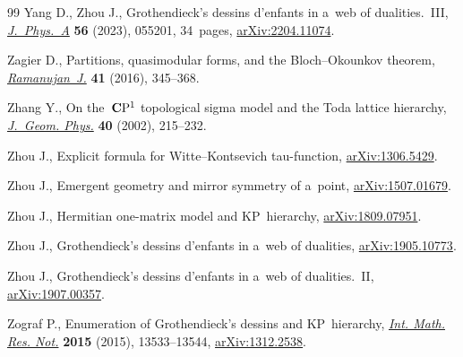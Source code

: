 \documentclass[pdftex]{sigma}
\numberwithin{equation}{section}
\begin{document}
\begin{thebibliography}{99}
Yang D., Zhou J., Grothendieck's dessins d'enfants in a~web of
 dualities.~{III},
 \href{https://doi.org/10.1088/1751-8121/acb744}{\textit{J.~Phys.~A}}
 \textbf{56} (2023), 055201, 34~pages,
 \href{http://arxiv.org/abs/2204.11074}{arXiv:2204.11074}.

Zagier D., Partitions, quasimodular forms, and the {B}loch--{O}kounkov theorem,
 \href{https://doi.org/10.1007/s11139-015-9730-8}{\textit{Ramanujan~J.}}
 \textbf{41} (2016), 345--368.

Zhang Y., On the~{${\bf C}{\rm P}^1$} topological sigma model and the {T}oda
 lattice hierarchy,
 \href{https://doi.org/10.1016/S0393-0440(01)00036-5}{\textit{J.~Geom. Phys.}}
 \textbf{40} (2002), 215--232.

Zhou J., Explicit formula for {W}itte--{K}ontsevich tau-function,
 \href{http://arxiv.org/abs/1306.5429}{arXiv:1306.5429}.

Zhou J., Emergent geometry and mirror symmetry of a~point,
 \href{http://arxiv.org/abs/1507.01679}{arXiv:1507.01679}.

Zhou J., Hermitian one-matrix model and {KP}~hierarchy,
 \href{http://arxiv.org/abs/1809.07951}{arXiv:1809.07951}.

Zhou J., Grothendieck's dessins d'enfants in a~web of dualities,
 \href{http://arxiv.org/abs/1905.10773}{arXiv:1905.10773}.

Zhou J., Grothendieck's dessins d'enfants in a~web of dualities.~{II},
 \href{http://arxiv.org/abs/1907.00357}{arXiv:1907.00357}.


Zograf P., Enumeration of {G}rothendieck's dessins and {KP}~hierarchy,
 \href{https://doi.org/10.1093/imrn/rnv077}{\textit{Int. Math. Res. Not.}}
 \textbf{2015} (2015), 13533--13544,
 \href{http://arxiv.org/abs/1312.2538}{arXiv:1312.2538}.

\end{thebibliography}\LastPageEnding
\end{document}
